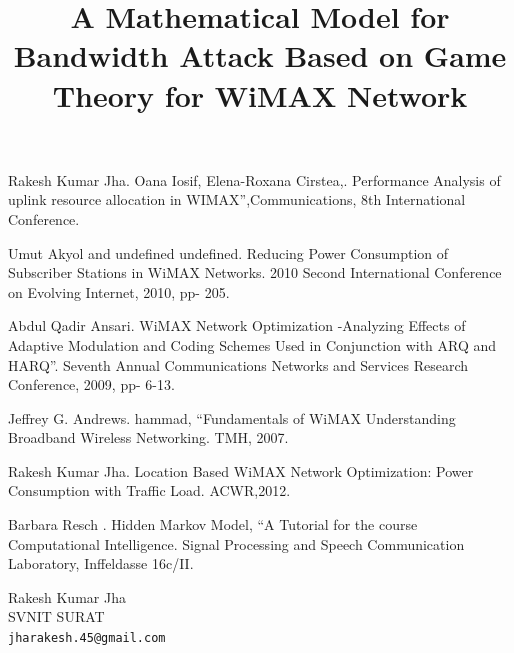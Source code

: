 \documentclass[article, A4, 11pt]{llncs}%
\begin{document}

\begin{thebibliography}{10}
{\sc Rakesh Kumar Jha}. {Oana Iosif, Elena-Roxana Cirstea,}. Performance Analysis of uplink resource allocation in WIMAX”,Communications, 8th International Conference.

{\sc Umut Akyol and undefined undefined}. {Reducing Power Consumption of Subscriber Stations in WiMAX Networks}. 2010 Second International Conference on Evolving Internet, 2010, pp- 205.

{\sc Abdul Qadir Ansari}. {WiMAX Network Optimization -Analyzing Effects of Adaptive Modulation and Coding Schemes Used in Conjunction with ARQ and HARQ”}. Seventh Annual Communications Networks and Services Research Conference, 2009, pp- 6-13.

{\sc Jeffrey G. Andrews}. {hammad, “Fundamentals of WiMAX Understanding Broadband Wireless Networking}. TMH, 2007.

{\sc Rakesh Kumar Jha}. {Location Based WiMAX Network Optimization: Power Consumption with Traffic Load}. ACWR,2012.

{\sc Barbara Resch }. {Hidden Markov Model, “A Tutorial for the course Computational Intelligence}. Signal Processing and Speech Communication Laboratory, Inffeldasse 16c/II.
\end{thebibliography} %

\title{A Mathematical Model for Bandwidth Attack Based on Game Theory for WiMAX Network}
 \author{} \institute{}
\maketitle
\begin{center}
{\large Rakesh Kumar Jha}\\
SVNIT SURAT\\
{\tt jharakesh.45@gmail.com}
\end{center}
\end{document}
